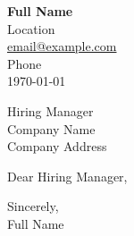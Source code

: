 \documentclass[11pt,a4paper]{letter}
\begin{document}
\begin{flushleft}
    \textbf{Full Name} \\
    Location \\
    \href{mailto:email@example.com}{email@example.com} \\
    Phone \\
    \today
\end{flushleft}

\vspace{12pt}

\begin{flushleft}
    Hiring Manager \\
    Company Name \\
    Company Address
\end{flushleft}

\vspace{12pt}

Dear Hiring Manager,

\vspace{8pt}




\vspace{8pt}

Sincerely, \\[24pt]
Full Name
\end{document}
